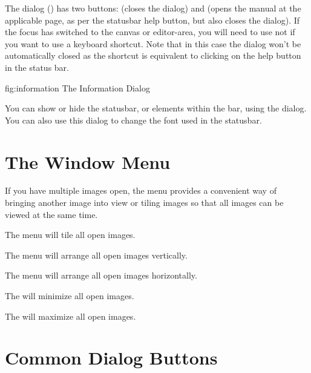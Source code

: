 
The  dialog () has two
buttons:  (closes the dialog) and  (opens
the manual at the applicable page, as per the \gls{statusbar} help
button, but also closes the  dialog). If the focus has
switched to the \gls{canvas} or \gls{editor-area}, you will need to
use  not  if you want to
use a keyboard shortcut. Note that in this case the 
dialog won't be automatically closed as the
 shortcut is equivalent to clicking on the
help button in the status bar.

\FloatFig
  {fig:information}
  {}
  {The Information Dialog}

You can show or hide the \gls*{statusbar}, or elements within the
bar, using the  dialog. You can also use this
dialog to change the font used in the \gls*{statusbar}.

\section{The Window Menu}\label{sec:thewindowmenu}

If you have multiple images open,
the  menu provides a convenient way of bringing 
another image into view or tiling images so that all images can be
viewed at the same time.


The  menu will tile all open images.


The  menu will arrange all open images
vertically.


The  menu will arrange all open images
horizontally.


The  will minimize all open images.


The  will maximize all open images.

\section{Common Dialog Buttons}\label{sec:commonwidgets}

